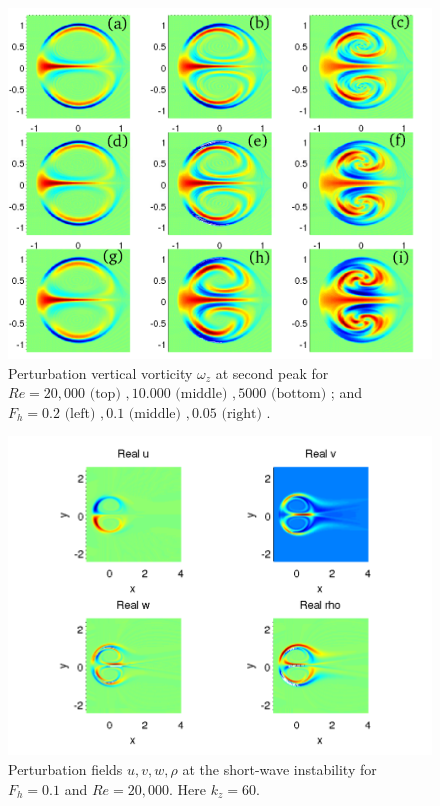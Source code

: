 \begin{figure}
\begin{center}
\includegraphics[width=\textwidth]{vorticity_second_peak}
\caption{Perturbation vertical vorticity $\omega_{z}$ at second peak for $Re=20{,}000\text{ (top) }, 10{.}000 \text{ (middle) }, 5000 \text{ (bottom) }$; and $F_{h}=0.2 \text{ (left) }, 0.1 \text{ (middle) }, 0.05 \text{ (right) }$.}
\label{secondpeak}
\end{center}
\end{figure}
\begin{figure}
\begin{center}
\includegraphics[width=\textwidth]{velocity_fields_kz_60}
\caption{Perturbation fields $u,v,w,\rho$ at the short-wave instability for $F_{h}=0.1$ and $Re=20{,}000$. Here $k_{z}=60$.} 
\label{secondpeak_fields}
\end{center}
\end{figure} 
